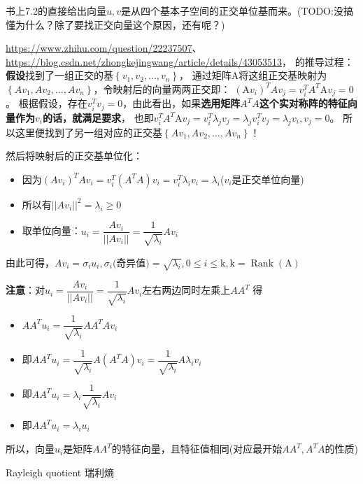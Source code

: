 书上7.2的直接给出向量$u,v$是从四个基本子空间的正交单位基而来。(TODO:没搞懂为什么？除了要找正交向量这个原因，还有呢？)

\url{https://www.zhihu.com/question/22237507}、\url{https://blog.csdn.net/zhongkejingwang/article/details/43053513}，
的推导过程：
\textbf{假设}找到了一组正交的基$\left\{v_{1}, v_{2}, \ldots, v_{n}\right\}$，
通过矩阵A将这组正交基映射为$\left\{A v_{1}, A v_{2}, \ldots, A v_{n}\right\}$，令映射后的向量两两正交即：
$\left(\mathrm{A} v_{i}\right)^{T} A v_{j}=v_{i}^{T} A^{T} \mathrm{A} v_{j}=0$。
根据假设，存在$v_{i}^{T} v_{j}=0$，由此看出，如果\textbf{选用矩阵$A^TA$这个实对称阵的特征向量作为$v_i$的话，就满足要求}，
也即$v_{i}^{T} A^{T} \mathrm{A} v_{j}= v_{i}^{T} \lambda_{j} v_{j} =\lambda_{j} v_{i}^{T} v_{j} =\lambda_{j} v_{i}, v_{j}=0$。
所以这里便找到了另一组对应的正交基$\left\{A v_{1}, A v_{2}, \ldots, A v_{n}\right\}$！

然后将映射后的正交基单位化：
\begin{itemize}
    \item 因为$(A v_{i})^T A v_{i}=v_{i}^T (A^TA)v_i = v_{i}^T \lambda_{i} v_{i}=\lambda_{i}$($v_i$是正交单位向量)
    \item 所以有$\left||A v_{i}\right||^{2}=\lambda_{i} \geq 0$
    \item 取单位向量：$u_{i}=\dfrac{A v_{i}}{\left||A v_{i}\right||}=\dfrac{1}{\sqrt{\lambda_{i}}} A v_{i}$
\end{itemize}
由此可得，$A v_{i}=\sigma_{i} u_{i}, \sigma_{i}($奇异值$)=\sqrt{\lambda_{i}}, 0 \leq i \leq \mathrm{k}, \mathrm{k}=\operatorname{Rank}(\mathrm{A})$

\textbf{注意}：对$u_{i}=\dfrac{A v_{i}}{\left||A v_{i}\right||}=\dfrac{1}{\sqrt{\lambda_{i}}} A v_{i}$左右两边同时左乘上$AA^T$
    得
\begin{itemize}
    \item $AA^Tu_{i}=\dfrac{1}{\sqrt{\lambda_{i}}} AA^TA v_{i}$
    \item 即$AA^Tu_{i}=\dfrac{1}{\sqrt{\lambda_{i}}} A(A^TA) v_{i}=\dfrac{1}{\sqrt{\lambda_{i}}} A \lambda_i v_{i}$
    \item 即$AA^Tu_{i}=\lambda_i \dfrac{1}{\sqrt{\lambda_{i}}} A  v_{i}$
    \item 即$AA^Tu_{i}=\lambda_i u_i$
\end{itemize}
所以，向量$u_i$是矩阵$AA^T$的特征向量，且特征值相同(对应最开始$AA^T, A^TA$的性质)

Rayleigh quotient 瑞利熵
